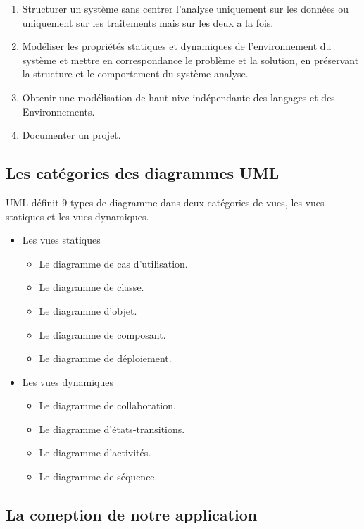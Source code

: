 \documentclass[french,a4,12pt]{report}
\begin{document}
\begin{enumerate}
	\item Structurer un système sans centrer l’analyse uniquement sur les données ou uniquement sur les traitements mais sur les deux a la fois.
	\item Modéliser les propriétés statiques et dynamiques de l’environnement du système et mettre en correspondance le problème et la solution, en préservant la structure et le comportement du système analyse.
	\item  Obtenir une modélisation de haut nive indépendante des langages et des Environnements.
	\item  Documenter un projet.
\end{enumerate}
\begin{tcolorbox}[colframe=green!75,rightrule=0.5cm,leftrule=0.5cm,]
\subsection{Les catégories des diagrammes UML}
\end{tcolorbox}
UML définit 9 types de diagramme dans deux catégories de vues, les vues statiques et les vues dynamiques.\cite{8}
\begin{itemize}%
\item Les vues statiques
\begin{itemize}%
	\item Le diagramme de cas d’utilisation.
	\item Le diagramme de classe.
	\item Le diagramme d’objet.
	\item Le diagramme de composant.
	\item Le diagramme de déploiement.
\end{itemize}
\item Les vues dynamiques
\begin{itemize}%
	\item Le diagramme de collaboration.
	\item Le diagramme d’états-transitions.
	\item Le diagramme d’activités.
	\item Le diagramme de séquence.
\end{itemize}
\end{itemize}
\newpage
\begin{tcolorbox}[leftrule=3mm]
\section{La coneption de notre application}
\end{tcolorbox}
\end{document}
